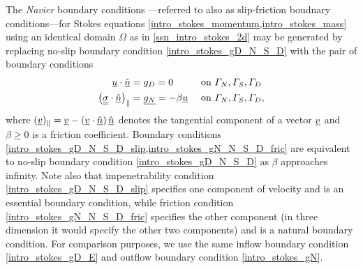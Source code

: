 The \emph{Navier} boundary conditions \citep{navier_1823}---referred to also as slip-friction boudnary conditions---for Stokes equations \cref{intro_stokes_momentum,intro_stokes_mass} using an identical domain $\Omega$ as in \cref{ssn_intro_stokes_2d} may be generated by replacing no-slip boundary condition \cref{intro_stokes_gD_N_S_D} with the pair of boundary conditions
\begin{align}
  \label{intro_stokes_gD_N_S_D_slip}
  \underline{u} \cdot \underline{\hat{n}} &= g_D = 0 &&\text{ on } \varGamma_N, \varGamma_S, \varGamma_D \\
  \label{intro_stokes_gN_N_S_D_fric}
  \left( \underline{\underline{\sigma}} \cdot \underline{\hat{n}} \right)_{\Vert} &= \underline{g_N} = -\beta \underline{u} &&\text{ on } \varGamma_N, \varGamma_S, \varGamma_D,
\end{align}
where $(\underline{v})_{\Vert} = \underline{v} - \left( \underline{v} \cdot \underline{\hat{n}} \right) \underline{\hat{n}}$ denotes the tangential component of a vector $\underline{v}$ and $\beta \geq 0$ is a friction coefficient.
Boundary conditions \cref{intro_stokes_gD_N_S_D_slip,intro_stokes_gN_N_S_D_fric} are equivalent to no-slip boundary condition \cref{intro_stokes_gD_N_S_D} as $\beta$ approaches infinity.
Note also that impenetrability condition \cref{intro_stokes_gD_N_S_D_slip} specifies one component of velocity and is an essential boundary condition, while friction condition \cref{intro_stokes_gN_N_S_D_fric} specifies the other component (in three dimension it would specify the other two components) and is a natural boundary condition.
For comparison purposes, we use the same inflow boundary condition \cref{intro_stokes_gD_E} and outflow boundary condition \cref{intro_stokes_gN}.


